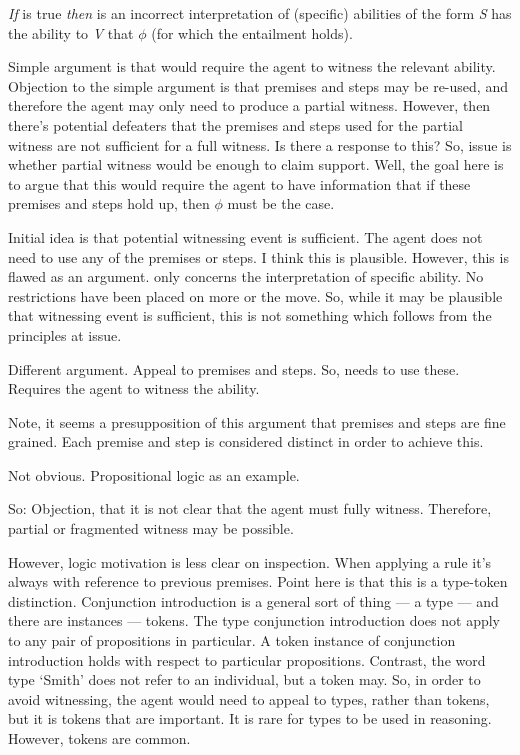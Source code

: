 \begin{note}[Proposition]
  \begin{proposition}\label{mcA:WR-and-denied-claim}
    \emph{If} \ESU{} is true \emph{then} \WR{} is an incorrect interpretation of (specific) abilities of the form \emph{S} has the ability to \emph{V} that \(\phi\) (for which the \aben{} entailment holds).
  \end{proposition}

  {
    \color{red}
    Simple argument is that \ESU{} would require the agent to witness the relevant ability.
    Objection to the simple argument is that premises and steps may be re-used, and therefore the agent may only need to produce a partial witness.
    However, then there's potential defeaters that the premises and steps used for the partial witness are not sufficient for a full witness.
    Is there a response to this?
    So, issue is whether partial witness would be enough to claim support.
    Well, the goal here is to argue that this would require the agent to have information that if these premises and steps hold up, then \(\phi\) must be the case.
  }


  {
    \color{green}
    Initial idea is that potential witnessing event is sufficient.
    The agent does not need to use any of the premises or steps.
    I think this is plausible.
    However, this is flawed as an argument.
    \WR{} only concerns the interpretation of specific ability.
    No restrictions have been placed on \gsi{} more or the \aben{} move.
    So, while it may be plausible that witnessing event is sufficient, this is not something which follows from the principles at issue.

    Different argument.
    Appeal to premises and steps.
    So, needs to use these.
    Requires the agent to witness the ability.

    Note, it seems a presupposition of this argument that premises and steps are fine grained.
    Each premise and step is considered distinct in order to achieve this.

    Not obvious.
    Propositional logic as an example.

    So: Objection, that it is not clear that the agent must fully witness.
    Therefore, partial or fragmented witness may be possible.

    However, logic motivation is less clear on inspection.
    When applying a rule it's always with reference to previous premises.
    Point here is that this is a type-token distinction.
    Conjunction introduction is a general sort of thing --- a type --- and there are instances --- tokens.
    The type conjunction introduction does not apply to any pair of propositions in particular.
    A token instance of conjunction introduction holds with respect to particular propositions.
    Contrast, the word type `Smith' does not refer to an individual, but a token may.
    So, in order to avoid witnessing, the agent would need to appeal to types, rather than tokens, but it is tokens that are important.
    It is rare for types to be used in reasoning.
    However, tokens are common.

}
\end{note}
